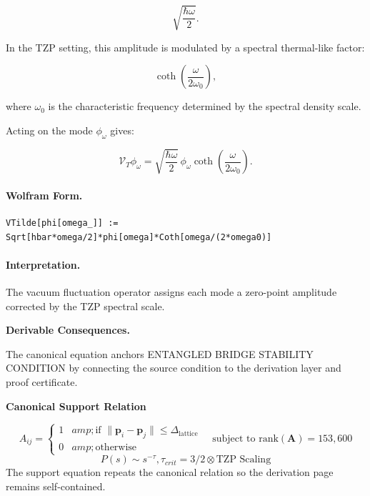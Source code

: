\begin{equation}
\sqrt{\frac{\hbar\omega}{2}} .
\end{equation}

In the TZP setting, this amplitude is modulated by a spectral thermal-like factor:

\begin{equation}
\coth\left(
\frac{\omega}{2\omega_0}
\right),
\end{equation}

where $\omega_0$ is the characteristic frequency determined by the spectral density scale.

Acting on the mode $\phi_{\omega}$ gives:

\begin{equation}
\boxed{
\mathcal{V}_T\phi_{\omega}
=
\sqrt{
\frac{\hbar\omega}{2}
}
\,\phi_{\omega}
\coth\left(
\frac{\omega}{2\omega_0}
\right).
}
\end{equation}

\paragraph{Wolfram Form.}
\begin{verbatim}
VTilde[phi[omega_]] := Sqrt[hbar*omega/2]*phi[omega]*Coth[omega/(2*omega0)]
\end{verbatim}

\paragraph{Interpretation.}
The vacuum fluctuation operator assigns each mode a zero-point amplitude corrected by the TZP spectral scale.
\endgroup

\par\vspace{0.35em}
\noindent\textbf{Derivable Consequences.}\quad
\begingroup
\footnotesize
\raggedright
The canonical equation anchors ENTANGLED BRIDGE STABILITY CONDITION by connecting the source condition to the derivation layer and proof certificate.
\par\endgroup

\noindent\textbf{Canonical Support Relation}\par
\[
A_{ij} = \begin{cases} 1 &amp; \text{if } \|\mathbf{p}_i - \mathbf{p}_j\| \leq \Delta_{\text{lattice}} \\ 0 &amp; \text{otherwise} \end{cases} \quad \text{subject to } \text{rank}(\mathbf{A}) = 153,600
\]
\[
P(s) \sim s^{-\tau}, \tau_{crit} = 3/2 \otimes \text{TZP Scaling}
\]
\noindent The support equation repeats the canonical relation so the derivation page remains self-contained.\par

